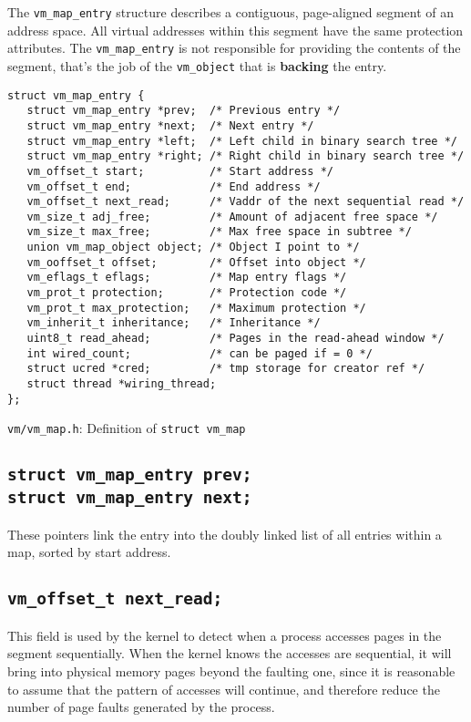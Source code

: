 \documentclass[shortabstract, english]{iithesis}
\begin{document}
The \texttt{vm_map_entry} structure describes a contiguous, page-aligned
segment of an address space. All virtual addresses within this segment have
the same protection attributes. The \texttt{vm_map_entry} is not responsible
for providing the contents of the segment, that's the job of the
\texttt{vm_object} that is \textbf{backing} the entry.

\begin{listing}[H]
\begin{verbatim}
struct vm_map_entry {
   struct vm_map_entry *prev;  /* Previous entry */
   struct vm_map_entry *next;  /* Next entry */
   struct vm_map_entry *left;  /* Left child in binary search tree */
   struct vm_map_entry *right; /* Right child in binary search tree */
   vm_offset_t start;          /* Start address */
   vm_offset_t end;            /* End address */
   vm_offset_t next_read;      /* Vaddr of the next sequential read */
   vm_size_t adj_free;         /* Amount of adjacent free space */
   vm_size_t max_free;         /* Max free space in subtree */
   union vm_map_object object; /* Object I point to */
   vm_ooffset_t offset;        /* Offset into object */
   vm_eflags_t eflags;         /* Map entry flags */
   vm_prot_t protection;       /* Protection code */
   vm_prot_t max_protection;   /* Maximum protection */
   vm_inherit_t inheritance;   /* Inheritance */
   uint8_t read_ahead;         /* Pages in the read-ahead window */
   int wired_count;            /* can be paged if = 0 */
   struct ucred *cred;         /* tmp storage for creator ref */
   struct thread *wiring_thread;
};
\end{verbatim}
\caption{\texttt{vm/vm\_map.h}: Definition of \texttt{struct vm_map}}
\end{listing}

\subsection*{\texttt{struct vm_map_entry prev;}\\
  \texttt{struct vm_map_entry next;}}
These pointers link the entry into the doubly linked list of all entries within
a map, sorted by start address.

\subsection*{\texttt{vm_offset_t next_read;}}
This field is used by the kernel to detect when a process accesses pages in the
segment sequentially. When the kernel knows the accesses are sequential, it will
bring into physical memory pages beyond the faulting one, since it is reasonable
to assume that the pattern of accesses will continue, and therefore reduce the
number of page faults generated by the process.
\end{document}
